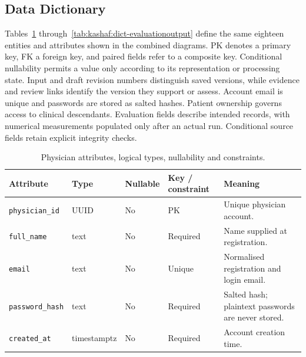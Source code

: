 \subsection{Data Dictionary}
Tables~\ref{tab:kashaf:dict-physician} through~\ref{tab:kashaf:dict-evaluationoutput} define the same eighteen entities and attributes shown in the combined diagrams. PK denotes a primary key, FK a foreign key, and paired fields refer to a composite key. Conditional nullability permits a value only according to its representation or processing state. Input and draft revision numbers distinguish saved versions, while evidence and review links identify the version they support or assess. Account email is unique and passwords are stored as salted hashes. Patient ownership governs access to clinical descendants. Evaluation fields describe intended records, with numerical measurements populated only after an actual run. Conditional source fields retain explicit integrity checks.

\begin{table}[htbp]
\setlength{\tabcolsep}{5pt}
\centering
\small
\caption{Physician attributes, logical types, nullability and constraints.}
\label{tab:kashaf:dict-physician}
\begin{tabular}{|p{}|p{}|p{}|p{}|p{}|}
\hline
Attribute & Type & Nullable & Key / constraint & Meaning \\ \hline
\texttt{physician\_id} & UUID & No & PK & Unique physician account. \\ \hline
\texttt{full\_name} & text & No & Required & Name supplied at registration. \\ \hline
\texttt{email} & text & No & Unique & Normalised registration and login email. \\ \hline
\texttt{password\_hash} & text & No & Required & Salted hash; plaintext passwords are never stored. \\ \hline
\texttt{created\_at} & timestamptz & No & Required & Account creation time. \\ \hline
\end{tabular}
\end{table}

